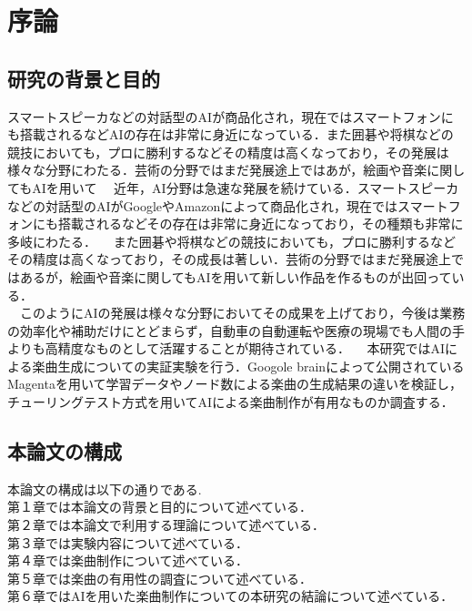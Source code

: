 \chapter{序論}

\section{研究の背景と目的}
スマートスピーカなどの対話型のAIが商品化され，現在ではスマートフォンにも搭載されるなどAIの存在は非常に身近になっている．また囲碁や将棋などの競技においても，プロに勝利するなどその精度は高くなっており，その発展は様々な分野にわたる．芸術の分野ではまだ発展途上ではあが，絵画や音楽に関してもAIを用いて
　近年，AI分野は急速な発展を続けている．スマートスピーカなどの対話型のAIがGoogleやAmazonによって商品化され，現在ではスマートフォンにも搭載されるなどその存在は非常に身近になっており，その種類も非常に多岐にわたる．
　また囲碁や将棋などの競技においても，プロに勝利するなどその精度は高くなっており，その成長は著しい．芸術の分野ではまだ発展途上ではあるが，絵画や音楽に関してもAIを用いて新しい作品を作るものが出回っている．\\
　このようにAIの発展は様々な分野においてその成果を上げており，今後は業務の効率化や補助だけにとどまらず，自動車の自動運転や医療の現場でも人間の手よりも高精度なものとして活躍することが期待されている．
　本研究ではAIによる楽曲生成についての実証実験を行う．Googole brainによって公開されているMagentaを用いて学習データやノード数による楽曲の生成結果の違いを検証し，チューリングテスト方式を用いてAIによる楽曲制作が有用なものか調査する．


\section{本論文の構成}
本論文の構成は以下の通りである.\\
第１章では本論文の背景と目的について述べている．\\
第２章では本論文で利用する理論について述べている．\\
第３章では実験内容について述べている．\\
第４章では楽曲制作について述べている．\\
第５章では楽曲の有用性の調査について述べている．\\
第６章ではAIを用いた楽曲制作についての本研究の結論について述べている．\\